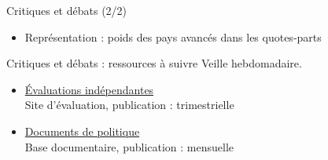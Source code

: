 \documentclass[aspectratio=169,11pt]{beamer}
\begin{document}
\begin{frame}{Critiques et débats (2/2)}
\begin{itemize}
\item Représentation : poids des pays avancés dans les quotes-parts
\end{itemize}
\end{frame}

\begin{frame}{Critiques et débats : ressources à suivre}
\small
Veille hebdomadaire.
\begin{itemize}
\item \href{https://ieo.imf.org}{Évaluations indépendantes}\\{\footnotesize Site d'évaluation, publication : trimestrielle}
\item \href{https://www.imf.org/en/Publications/Policy-Papers}{Documents de politique}\\{\footnotesize Base documentaire, publication : mensuelle}
\end{itemize}
\end{frame}
\end{document}
